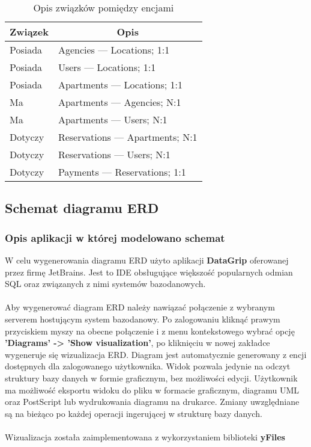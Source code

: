 \documentclass[polish, 11pt]{article}
\begin{document}
            \begin{table}[H]
                \centering
                \caption{Opis związków pomiędzy encjami}\label{tab:relations}
                \begin{tabular}{ll}\toprule
                    \multicolumn{1}{c}{Związek}	&	\multicolumn{1}{c}{Opis}	\\\midrule
                    Posiada	&	Agencies --- Locations; 1:1	\\
                    Posiada	&	Users --- Locations; 1:1	\\
                    Posiada	&	Apartments --- Locations; 1:1	\\
                    Ma	    &	Apartments --- Agencies; N:1	\\
                    Ma  	&	Apartments --- Users; N:1	\\
                    Dotyczy	&	Reservations --- Apartments; N:1	\\
                    Dotyczy	&	Reservations --- Users; N:1	\\
                    Dotyczy	&	Payments --- Reservations; 1:1	\\
                \bottomrule
                \end{tabular}
            \end{table}

    \subsection{Schemat diagramu ERD}\label{subsec:diagram}
	    \subsubsection{Opis aplikacji w której modelowano schemat}
		    W celu wygenerowania diagramu ERD użyto aplikacji {\bfseries DataGrip} oferowanej przez firmę JetBrains. 
		    Jest to IDE obsługujące większość popularnych odmian SQL oraz związanych z nimi systemów bazodanowych.\\\\
		    Aby wygenerować diagram ERD należy nawiązać połączenie z wybranym serverem hostującym system
		    bazodanowy. Po zalogowaniu kliknąć prawym przyciskiem myszy na obecne połączenie i z menu kontekstowego
		    wybrać opcję {\bfseries'Diagrams' -> 'Show visualization'}, po kliknięciu w nowej zakładce wygeneruje się wizualizacja
		    ERD. Diagram jest automatycznie generowany z encji dostępnych dla zalogowanego użytkownika. Widok pozwala jedynie na
		    odczyt struktury bazy danych w formie graficznym, bez możliwości edycji. Użytkownik ma możliwość eksportu widoku
		    do pliku w formacie graficznym, diagramu UML oraz PostScript lub wydrukowania diagramu na drukarce. Zmiany uwzględniane
		    są na bieżąco po każdej operacji ingerującej w strukturę bazy danych.\\\\
		    Wizualizacja została zaimplementowana z wykorzystaniem biblioteki {\bfseries yFiles}
	    
\end{document}
